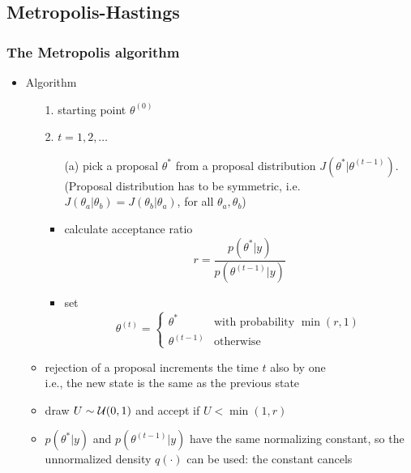 \documentclass[10pt]{beamer}
\begin{document}
\subsection{Metropolis-Hastings}
\frame{\subsectionpage}

\begin{frame}

\frametitle{The Metropolis algorithm}

  \begin{itemize}
  \item Algorithm
    \begin{itemize}
      \item[1.] starting point $\theta^{(0)}$
      \item[2.] $t=1,2,\ldots$
        \begin{itemize}
        \item[(a)] pick a proposal $\theta^{*}$ from a {\color{uured} proposal distribution}
          $J(\theta^{*}|\theta^{(t-1)})$. \\
          (Proposal distribution has to be symmetric, i.e.\\
          $J(\theta_a|\theta_b)=J(\theta_b|\theta_a)$, for all
          $\theta_a,\theta_b$)
        \item<2->[(b)] calculate acceptance ratio
          \begin{equation*}
            r=\frac{p(\theta^{*}|y)}{p(\theta^{(t-1)}|y)}
          \end{equation*}
          \vspace{-6mm}
        \item<3->[(c)] set
          \begin{equation*}
            \theta^{(t)}=
            \begin{cases}
              \theta^{*} & \text{with probability $\min(r,1)$}\\
              \theta^{(t-1)} & \text{otherwise}
            \end{cases}
          \end{equation*}
      \end{itemize}
      \vspace{-1.5\baselineskip}
    \item<5-> rejection of a proposal increments the time $t$ also by one\\
      i.e., the new state is the same as the previous state
      \item<6-> draw $U\sim\mathcal{U}(0,1)$ and accept if $U<\min(1,r)$
      \item<7-> $p(\theta^*|y)$ and $p(\theta^{(t-1)}|y)$ have the same
        normalizing constant, so the unnormalized density $q(\cdot)$
        can be used: {\color{uured}the constant cancels}
    \end{itemize}
  \end{itemize}

\end{frame}
\end{document}

